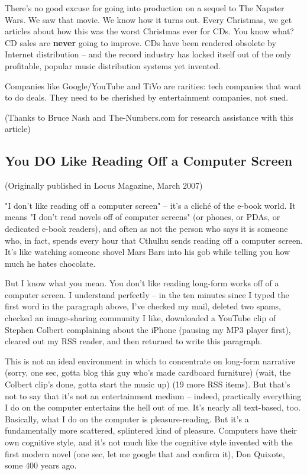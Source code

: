 There's no good excuse for going into production on a sequel to The
Napster Wars. We saw that movie. We know how it turns out. Every
Christmas, we get articles about how this was the worst Christmas
ever for CDs. You know what? CD sales are \textbf{never} going to
improve. CDs have been rendered obsolete by Internet distribution
-- and the record industry has locked itself out of the only
profitable, popular music distribution systems yet invented.

Companies like Google/YouTube and TiVo are rarities: tech companies
that want to do deals. They need to be cherished by entertainment
companies, not sued.

(Thanks to Bruce Nash and The-Numbers.com for research assistance
with this article)

\subsection{You DO Like Reading Off a Computer Screen}

(Originally published in Locus Magazine, March 2007)

"I don't like reading off a computer screen" -- it's a cliché of
the e-book world. It means "I don't read novels off of computer
screens" (or phones, or PDAs, or dedicated e-book readers), and
often as not the person who says it is someone who, in fact, spends
every hour that Cthulhu sends reading off a computer screen. It's
like watching someone shovel Mars Bars into his gob while telling
you how much he hates chocolate.

But I know what you mean. You don't like reading long-form works
off of a computer screen. I understand perfectly -- in the ten
minutes since I typed the first word in the paragraph above, I've
checked my mail, deleted two spams, checked an image-sharing
community I like, downloaded a YouTube clip of Stephen Colbert
complaining about the iPhone (pausing my MP3 player first), cleared
out my RSS reader, and then returned to write this paragraph.

This is not an ideal environment in which to concentrate on
long-form narrative (sorry, one sec, gotta blog this guy who's made
cardboard furniture) (wait, the Colbert clip's done, gotta start
the music up) (19 more RSS items). But that's not to say that it's
not an entertainment medium -- indeed, practically everything I do
on the computer entertains the hell out of me. It's nearly all
text-based, too. Basically, what I do on the computer is
pleasure-reading. But it's a fundamentally more scattered,
splintered kind of pleasure. Computers have their own cognitive
style, and it's not much like the cognitive style invented with the
first modern novel (one sec, let me google that and confirm it),
Don Quixote, some 400 years ago.

